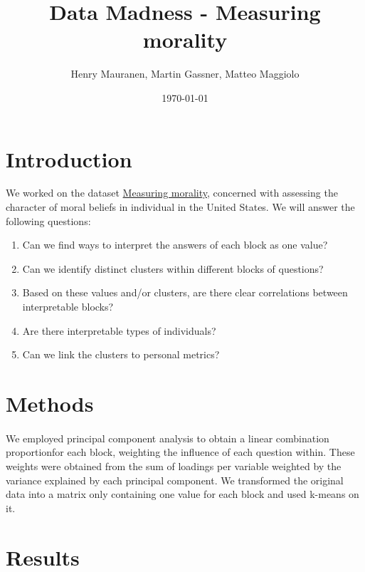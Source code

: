 \documentclass{article}
\title{Data Madness - Measuring morality}
\date{\today}
\author{Henry Mauranen, Martin Gassner, Matteo Maggiolo}
\begin{document}
\maketitle

\section{Introduction}
We worked on the dataset \href{http://kenan.ethics.duke.edu/attitudes/resources/measuring-morality/}{Measuring morality}, concerned with assessing the character of moral beliefs in individual in the United States.
We will answer the following questions:
\begin{enumerate}
\item \label{qs:aggregation} Can we find ways to interpret the answers of each block as one value? 
\item \label{qs:blockCluster} Can we identify distinct clusters within different blocks of questions? 
\item \label{qs:blockCorrelations} Based on these values and/or clusters, are there clear correlations between interpretable blocks? 
\item \label{qs:types} Are there interpretable types of individuals? 
\item \label{qs:personal} Can we link the clusters to personal metrics? 
\end{enumerate}

\section{Methods}


\paragraph{}
We employed principal component analysis to obtain a linear combination proportionfor each block, weighting the influence of each question within.
These weights were obtained from the sum of loadings per variable weighted by the variance explained by each principal component.
We transformed the original data into a matrix only containing one value for each block and used k-means on it.

\section{Results}
\end{document}
